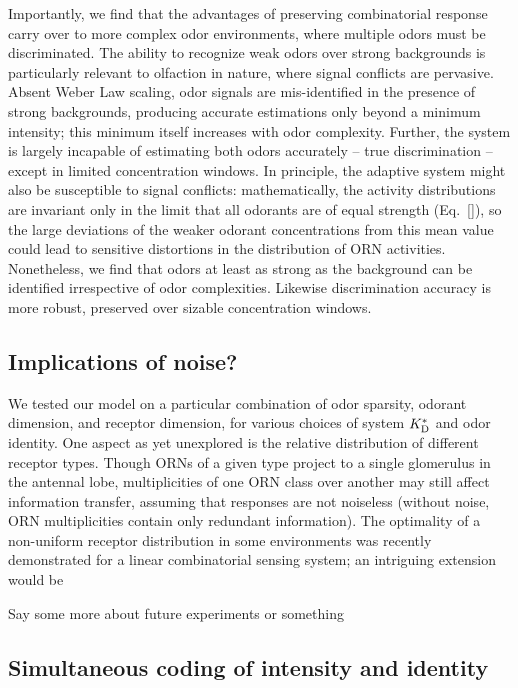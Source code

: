 Importantly, we find that the advantages of preserving combinatorial response carry over to more complex odor environments, where multiple odors must be discriminated. The ability to recognize weak odors over strong backgrounds is particularly relevant to olfaction in nature, where signal conflicts are pervasive. Absent Weber Law scaling, odor signals are mis-identified in the presence of strong backgrounds, producing accurate estimations only beyond a minimum intensity; this minimum itself increases with odor complexity. Further, the system is largely incapable of estimating both odors accurately -- true discrimination -- except in limited concentration windows. In principle, the adaptive system might also be susceptible to signal conflicts: mathematically, the activity distributions are invariant only in the limit that all odorants are of equal strength (Eq.~\ref{}), so the large deviations of the weaker odorant concentrations from this mean value could lead to sensitive distortions in the distribution of ORN activities. Nonetheless, we find that odors at least as strong as the background can be identified irrespective of odor complexities. Likewise discrimination accuracy is more robust, preserved over sizable concentration windows. 


\subsection*{Implications of noise?}
We tested our model on a particular combination of odor sparsity, odorant dimension, and receptor dimension, for various choices of system $K^*_{\text D}$ and odor identity. One aspect as yet unexplored is the relative distribution of different receptor types. Though ORNs of a given type project to a single glomerulus in the antennal lobe, multiplicities of one ORN class over another may still affect information transfer, assuming that responses are not noiseless (without noise, ORN multiplicities contain only redundant information). The optimality of a non-uniform receptor distribution in some environments was recently demonstrated for a linear combinatorial sensing system; an intriguing extension would be 





{\color{blue} Say some more about future experiments or something}


\subsection*{Simultaneous coding of intensity and identity}

